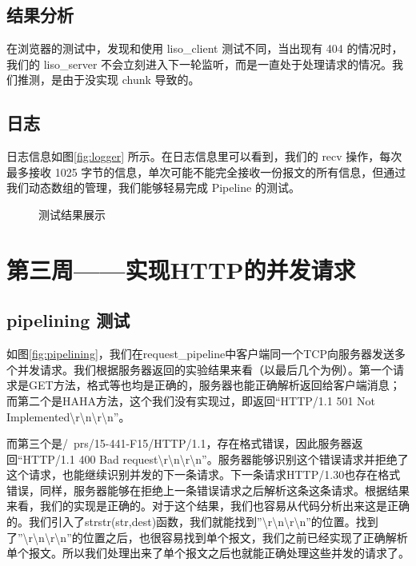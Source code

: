 \subsection{结果分析}
在浏览器的测试中，发现和使用 liso\_client 测试不同，当出现有 404 的情况时，我们的 liso\_server 不会立刻进入下一轮监听，而是一直处于处理请求的情况。我们推测，是由于没实现 chunk 导致的。

\subsection{日志}
日志信息如图\ref{fig:logger} 所示。在日志信息里可以看到，我们的 recv 操作，每次最多接收 1025 字节的信息，单次可能不能完全接收一份报文的所有信息，但通过我们动态数组的管理，我们能够轻易完成 Pipeline 的测试。

\begin{figure}[htbp!]
    \centering
    \caption{测试结果展示}\label{fig:result}
\end{figure}


\section{第三周——实现HTTP的并发请求}


\subsection{pipelining 测试}

如图\ref{fig:pipelining}，我们在request\_pipeline中客户端同一个TCP向服务器发送多个并发请求。我们根据服务器返回的实验结果来看（以最后几个为例）。第一个请求是GET方法，格式等也均是正确的，服务器也能正确解析返回给客户端消息；而第二个是HAHA方法，这个我们没有实现过，即返回“HTTP/1.1 501 Not Implemented\textbackslash r\textbackslash n\textbackslash r\textbackslash n”。

而第三个是/~prs/15-441-F15/HTTP/1.1，存在格式错误，因此服务器返回“HTTP/1.1 400 Bad request\textbackslash r\textbackslash n\textbackslash r\textbackslash n”。服务器能够识别这个错误请求并拒绝了这个请求，也能继续识别并发的下一条请求。下一条请求HTTP/1.30也存在格式错误，同样，服务器能够在拒绝上一条错误请求之后解析这条这条请求。根据结果来看，我们的实现是正确的。对于这个结果，我们也容易从代码分析出来这是正确的。我们引入了strstr(str,dest)函数，我们就能找到”\textbackslash r\textbackslash n\textbackslash r\textbackslash n”的位置。找到了”\textbackslash r\textbackslash n\textbackslash r\textbackslash n”的位置之后，也很容易找到单个报文，我们之前已经实现了正确解析单个报文。所以我们处理出来了单个报文之后也就能正确处理这些并发的请求了。

